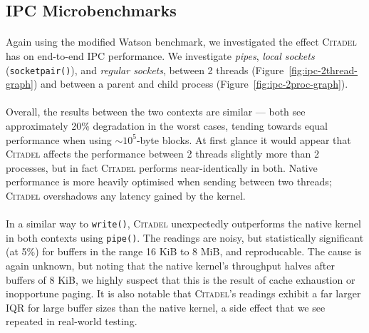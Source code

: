 \subsection{IPC Microbenchmarks}
\label{sec:ipc-microbenchmarks}

\paragraph{} Again using the modified Watson benchmark, we investigated the effect \textsc{Citadel} has on end-to-end IPC performance. We investigate \textit{pipes}, \textit{local sockets} (\texttt{socketpair()}), and \textit{regular sockets}, between 2 threads (Figure~\ref{fig:ipc-2thread-graph}) and between a parent and child process (Figure~\ref{fig:ipc-2proc-graph}).

\paragraph{} Overall, the results between the two contexts are similar --- both see approximately 20\% degradation in the worst cases, tending towards equal performance when using $\sim 10^5$-byte blocks. At first glance it would appear that \textsc{Citadel} affects the performance between 2 threads slightly more than 2 processes, but in fact \textsc{Citadel} performs near-identically in both. Native performance is more heavily optimised when sending between two threads; \textsc{Citadel} overshadows any latency gained by the kernel.

\paragraph{} In a similar way to \texttt{write()}, \textsc{Citadel} unexpectedly outperforms the native kernel in both contexts using \texttt{pipe()}. The readings are noisy, but statistically significant (at 5\%) for buffers in the range 16 KiB to 8 MiB, and reproducable. The cause is again unknown, but noting that the native kernel's throughput halves after buffers of 8 KiB, we highly suspect that this is the result of cache exhaustion or inopportune paging. It is also notable that \textsc{Citadel}'s readings exhibit a far larger IQR for large buffer sizes than the native kernel, a side effect that we see repeated in real-world testing.

